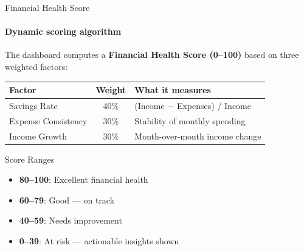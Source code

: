 \documentclass[aspectratio=169, 12pt]{beamer}
\begin{document}
\begin{frame}{Financial Health Score}
\framesubtitle{Dynamic scoring algorithm}

The dashboard computes a \textbf{Financial Health Score (0--100)} based on three weighted factors:

\vspace{10pt}
\begin{center}
\begin{tabular}{l c l}
\toprule
\textbf{Factor} & \textbf{Weight} & \textbf{What it measures} \\
\midrule
Savings Rate & 40\% & (Income $-$ Expenses) / Income \\
Expense Consistency & 30\% & Stability of monthly spending \\
Income Growth & 30\% & Month-over-month income change \\
\bottomrule
\end{tabular}
\end{center}

\vspace{10pt}
\begin{block}{Score Ranges}
\begin{itemize}\itemsep=1pt
    \item \textbf{80--100}: Excellent financial health
    \item \textbf{60--79}: Good --- on track
    \item \textbf{40--59}: Needs improvement
    \item \textbf{0--39}: At risk --- actionable insights shown
\end{itemize}
\end{block}
\end{frame}
\end{document}
